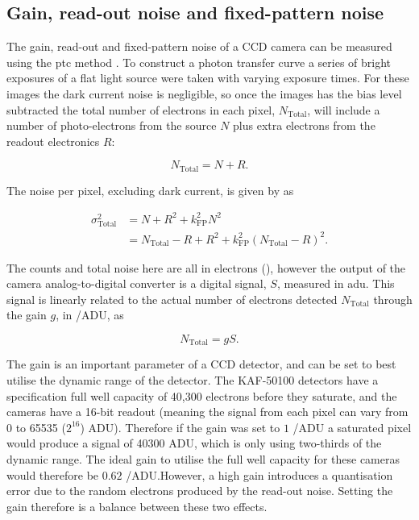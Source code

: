 \begin{colsection}
\begin{colsection}
\end{colsection}

\newpage
\subsection{Gain, read-out noise and fixed-pattern noise}
\label{sec:ptc}
\begin{colsection}

The gain, read-out and fixed-pattern noise of a CCD camera can be measured using the \gls{ptc} method \citep{CCDs, PTC}. To construct a photon transfer curve a series of bright exposures of a flat light source were taken with varying exposure times. For these images the dark current noise is negligible, so once the images has the bias level subtracted the total number of electrons in each pixel, $N_\text{Total}$, will include a number of photo-electrons from the source $N$ plus extra electrons from the readout electronics $R$:

\begin{equation}
    N_\text{Total} = N + R.
    \label{eq:total_count}
\end{equation}

The noise per pixel, excluding dark current, is given by  as

\begin{equation}
    \begin{split}
        \sigma_\text{Total}^2 & = N + R^2 + k_\text{FP}^2 N^2 \\
                              & = N_\text{Total} - R + R^2 + k_\text{FP}^2{(N_\text{Total} - R)}^2.
    \end{split}
    \label{eq:ptc_noise1}
\end{equation}

The counts and total noise here are all in electrons (\elec), however the output of the camera analog-to-digital converter is a digital signal, $S$, measured in \gls{adu}. This signal is linearly related to the actual number of electrons detected $N_\text{Total}$ through the gain $g$, in \elec/ADU, as

\begin{equation}
    N_\text{Total} = g S.
    \label{eq:gain}
\end{equation}

The gain is an important parameter of a CCD detector, and can be set to best utilise the dynamic range of the detector. The KAF-50100 detectors have a specification full well capacity of 40,300 electrons before they saturate, and the cameras have a 16-bit readout (meaning the signal from each pixel can vary from 0 to 65535 ($2^{16}$) ADU). Therefore if the gain was set to $1$ \elec/ADU a saturated pixel would produce a signal of 40300 ADU, which is only using two-thirds of the dynamic range. The ideal gain to utilise the full well capacity for these cameras would therefore be $0.62$ \elec/ADU.\@ However, a high gain introduces a quantisation error due to the random electrons produced by the read-out noise. Setting the gain therefore is a balance between these two effects.


\end{colsection}
\end{colsection}
